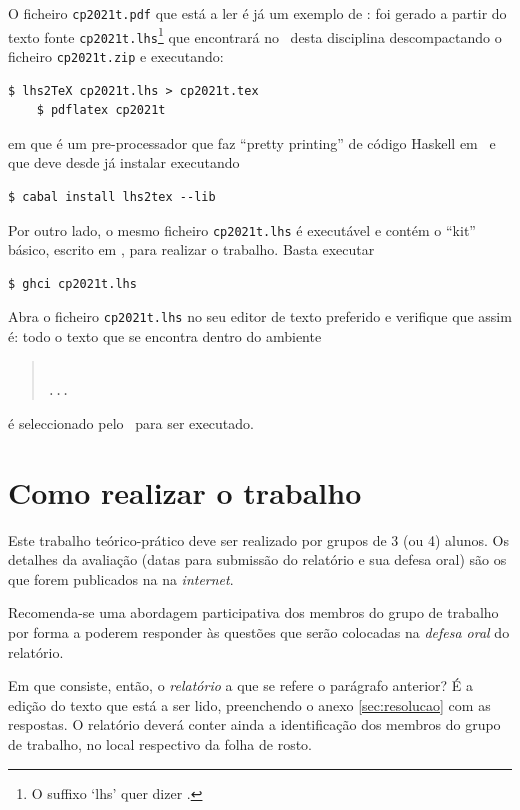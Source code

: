 \documentclass[a4paper]{article}
\begin{document}
O ficheiro \texttt{cp2021t.pdf} que está a ler é já um exemplo de
: foi gerado a partir do texto fonte
\texttt{cp2021t.lhs}\footnote{O suffixo `lhs' quer dizer
\emph{}.} que encontrará no
\MaterialPedagogico\ desta disciplina descompactando o ficheiro
\texttt{cp2021t.zip} e executando:
\begin{Verbatim}[fontsize=\small]
    $ lhs2TeX cp2021t.lhs > cp2021t.tex
    $ pdflatex cp2021t
\end{Verbatim}
em que \href{https://hackage.haskell.org/package/lhs2tex}{\texttt\LhsToTeX} é
um pre-processador que faz ``pretty printing''
de código Haskell em \Latex\ e que deve desde já instalar executando
\begin{Verbatim}[fontsize=\small]
    $ cabal install lhs2tex --lib
\end{Verbatim}
Por outro lado, o mesmo ficheiro \texttt{cp2021t.lhs} é executável e contém
o ``kit'' básico, escrito em \Haskell, para realizar o trabalho. Basta executar
\begin{Verbatim}[fontsize=\small]
    $ ghci cp2021t.lhs
\end{Verbatim}


\noindent Abra o ficheiro \texttt{cp2021t.lhs} no seu editor de texto preferido
e verifique que assim é: todo o texto que se encontra dentro do ambiente
\begin{quote}\small\tt
{}
\\ ... \\
\end{quote}
é seleccionado pelo \GHCi\ para ser executado.

\section{Como realizar o trabalho}
Este trabalho teórico-prático deve ser realizado por grupos de 3 (ou 4) alunos.
Os detalhes da avaliação (datas para submissão do relatório e sua defesa
oral) são os que forem publicados na  na \emph{internet}.

Recomenda-se uma abordagem participativa dos membros do grupo
de trabalho por forma a poderem responder às questões que serão colocadas
na \emph{defesa oral} do relatório.

Em que consiste, então, o \emph{relatório} a que se refere o parágrafo anterior?
É a edição do texto que está a ser lido, preenchendo o anexo \ref{sec:resolucao}
com as respostas. O relatório deverá conter ainda a identificação dos membros
do grupo de trabalho, no local respectivo da folha de rosto.
\end{document}
